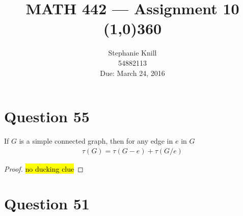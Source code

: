 \documentclass[11pt, oneside]{article}   	%
\begin{document}
\title{MATH 442 --- Assignment 10 \\
\line(1,0){360} \\              %
}
\author{
Stephanie Knill \\
54882113 \\
Due: March 24, 2016}

\date{}                   %
\maketitle




\section*{Question 55}

If $G$ is a simple connected graph, then for any edge in $e$ in $G$
\begin{align}
\tau(G) = \tau(G-e) + \tau(G/e)
\label{eq1}
\end{align}

\begin{proof}
\hl{no ducking clue}
\end{proof}

\section*{Question 51}
\end{document}
